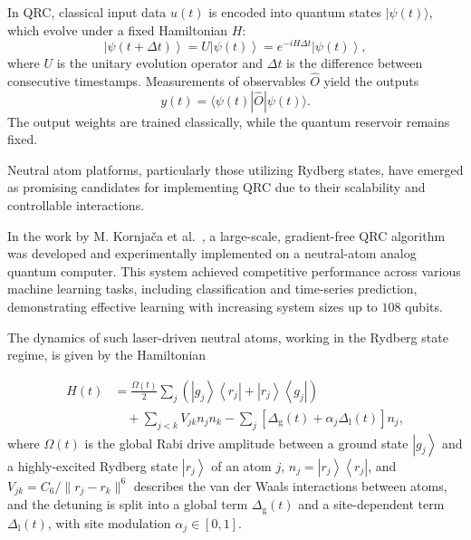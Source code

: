 \documentclass[conference]{IEEEtran}
\newcommand{\ket}[1]{\left\lvert #1 \right\rangle}
\newcommand{\ketbra}[2]{\left\lvert #1 \right\rangle \left\langle #2 \right\rvert}
\begin{document}
In QRC, classical input data \( u(t) \) is encoded into quantum states \( |\psi(t)\rangle \),
which evolve under a fixed Hamiltonian \( H \):
\begin{equation}
    \ket{\psi(t+\Delta t)}
    = U \ket{\psi(t)}
    = e^{-iH\Delta t} \ket{\psi(t)},
\end{equation}
where \( U \) is the unitary evolution operator and \(\Delta t\) is the difference between consecutive timestamps. Measurements of observables \( \hat{O} \) yield the outputs
\begin{equation}
    y(t) = \langle \psi(t) | \hat{O} | \psi(t) \rangle.
\end{equation}
The output weights are trained classically, while the quantum reservoir remains fixed.

Neutral atom platforms, particularly those utilizing Rydberg states, have emerged as promising candidates for implementing QRC due to their scalability and controllable interactions.

In the work by M. Kornjača et al.~\cite{kornjavcaLargescaleQuantumReservoir2024}, a large-scale, gradient-free QRC algorithm was developed and experimentally implemented on a neutral-atom analog quantum computer. This system achieved competitive performance across various machine learning tasks, including classification and time-series prediction, demonstrating effective learning with increasing system sizes up to $108$ qubits.


The dynamics of such laser-driven neutral atoms, working in the Rydberg state regime, is given by the Hamiltonian~\cite{kornjavcaLargescaleQuantumReservoir2024}

\begin{align}
    H(t)
    &=
    \frac{\Omega(t)}{2}
    \sum_j
    \left(
        \ketbra{g_j}{r_j}
        + \ketbra{r_j}{g_j}
    \right) \nonumber \\
    & \quad + \sum_{j<k}
    V_{jk} n_j n_k
    - \sum_j
    \left[
        \Delta_{\mathrm{g}}(t)
        + \alpha_j \Delta_{\mathrm{l}}(t)
    \right] n_j,
\label{eq:rydberg_hamiltonian}
\end{align}
where $\Omega(t)$ is the global Rabi drive amplitude between a 
ground state $\ket{g_j}$ and a highly-excited Rydberg state 
$\ket{r_j}$ of an atom $j$,
$n_j = \ketbra{r_j}{r_j}$, and 
\( V_{jk} = C_6/\|r_j - r_k\|^6 \) describes the van der Waals interactions
between atoms, and the detuning is split into a global term 
\( \Delta_{\mathrm{g}}(t) \)
and a site-dependent term \( \Delta_{\mathrm{l}}(t) \), with site 
modulation \( \alpha_j \in [0, 1] \).
\end{document}

